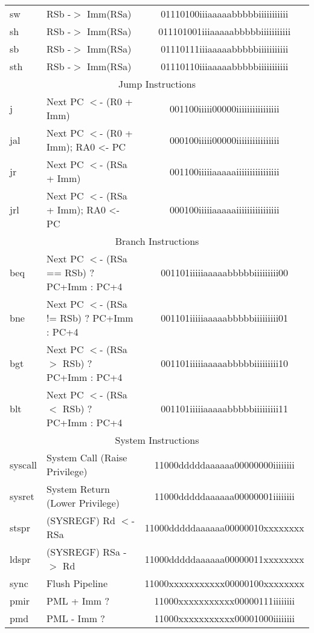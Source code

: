 \documentclass[letterpaper, 11pt]{article}
\begin{document}
\begin{center}
\begin{longtable}{|l|l|c|}
			sw			& RSb -$>$ Imm(RSa)								& 01110100iiiaaaaabbbbbiiiiiiiiiii\\
			sh			& RSb -$>$ Imm(RSa)								& 011101001iiiaaaaabbbbbiiiiiiiiiii\\
			sb			& RSb -$>$ Imm(RSa)								& 01110111iiiaaaaabbbbbiiiiiiiiiii\\
			sth			& RSb -$>$ Imm(RSa)								& 01110110iiiaaaaabbbbbiiiiiiiiiii\\
			\hline
			\multicolumn{3}{|c|}{Jump Instructions} \\ \hline		
			j			& Next PC $<$- (R0 + Imm)						& 001100iiiii00000iiiiiiiiiiiiiiii\\
			jal			& Next PC $<$- (R0 + Imm); RA0 <- PC 			& 000100iiiii00000iiiiiiiiiiiiiiii\\
			jr			& Next PC $<$- (RSa + Imm)						& 001100iiiiiaaaaaiiiiiiiiiiiiiiii\\
			jrl			& Next PC $<$- (RSa + Imm); RA0 <- PC			& 000100iiiiiaaaaaiiiiiiiiiiiiiiii\\
			\hline
			\multicolumn{3}{|c|}{Branch Instructions} \\ \hline
			beq			& Next PC $<$- (RSa == RSb) ? PC+Imm : PC+4		& 001101iiiiiaaaaabbbbbiiiiiiiii00\\
			bne			& Next PC $<$- (RSa != RSb) ? PC+Imm : PC+4		& 001101iiiiiaaaaabbbbbiiiiiiiii01\\
			bgt			& Next PC $<$- (RSa $>$ RSb) ? PC+Imm : PC+4	& 001101iiiiiaaaaabbbbbiiiiiiiii10\\
			blt			& Next PC $<$- (RSa $<$ RSb) ? PC+Imm : PC+4	& 001101iiiiiaaaaabbbbbiiiiiiiii11\\
			\hline
			\multicolumn{3}{|c|}{System Instructions} \\ \hline
			syscall		& System Call (Raise Privilege)					& 11000dddddaaaaaa00000000iiiiiiii\\
			sysret		& System Return (Lower Privilege)				& 11000dddddaaaaaa00000001iiiiiiii\\
			stspr		& (SYSREGF) Rd $<$- RSa							& 11000dddddaaaaaa00000010xxxxxxxx\\
			ldspr		& (SYSREGF) RSa -$>$ Rd							& 11000dddddaaaaaa00000011xxxxxxxx\\
			sync		& Flush Pipeline								& 11000xxxxxxxxxxx00000100xxxxxxxx\\
			pmir		& PML + Imm ?									& 11000xxxxxxxxxxx00000111iiiiiiii\\
			pmd			& PML - Imm ?									& 11000xxxxxxxxxxx00001000iiiiiiii\\
			\hline
		\end{longtable}
	\end{center}
\end{document}
